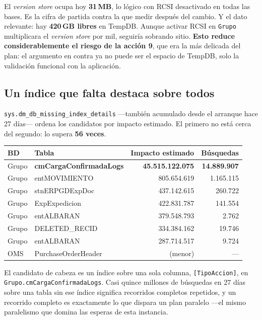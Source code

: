 \documentclass[11pt,a4paper]{article}
\newcommand{\cod}[1]{\texttt{\small #1}}
\newcommand{\critico}[1]{\textcolor{rojo}{\textbf{#1}}}
\begin{document}
El \emph{version store} ocupa hoy \textbf{31\,MB}, lo lógico con RCSI
desactivado en todas las bases. Es la cifra de partida contra la que medir
después del cambio. Y el dato relevante: hay \textbf{420\,GB libres} en
TempDB. Aunque activar RCSI en \cod{Grupo} multiplicara el \emph{version
store} por mil, seguiría sobrando sitio. \textbf{Esto reduce
considerablemente el riesgo de la acción 9}, que era la más delicada del
plan: el argumento en contra ya no puede ser el espacio de TempDB, solo la
validación funcional con la aplicación.

\subsection{Un índice que falta destaca sobre todos}

\cod{sys.dm\_db\_missing\_index\_details} —también acumulado desde el arranque
hace 27 días— ordena los candidatos por impacto estimado. El primero no está
cerca del segundo: lo supera \textbf{56 veces}.

\begin{table}[h]
\centering
\small
\begin{tabular}{llrr}
\toprule
\textbf{BD} & \textbf{Tabla} & \textbf{Impacto estimado} & \textbf{Búsquedas} \\
\midrule
Grupo & \critico{cmCargaConfirmadaLogs} & \critico{45.515.122.075} & \critico{14.889.907} \\
Grupo & entMOVIMIENTO    &   805.654.619 & 1.165.115 \\
Grupo & stnERPGDExpDoc   &   437.142.615 &   260.722 \\
Grupo & ExpExpedicion    &   422.831.787 &   141.554 \\
Grupo & entALBARAN       &   379.548.793 &     2.762 \\
Grupo & DELETED\_RECID   &   334.384.162 &    19.746 \\
Grupo & entALBARAN       &   287.714.517 &     9.724 \\
OMS   & PurchaseOrderHeader & (menor)    &       --- \\
\bottomrule
\end{tabular}
\end{table}

El candidato de cabeza es un índice sobre una sola columna,
\cod{[TipoAccion]}, en \cod{Grupo.cmCargaConfirmadaLogs}. Casi quince millones
de búsquedas en 27 días sobre una tabla sin ese índice significa recorridos
completos repetidos, y un recorrido completo es exactamente lo que dispara un
plan paralelo —el mismo paralelismo que domina las esperas de esta instancia.
\end{document}
